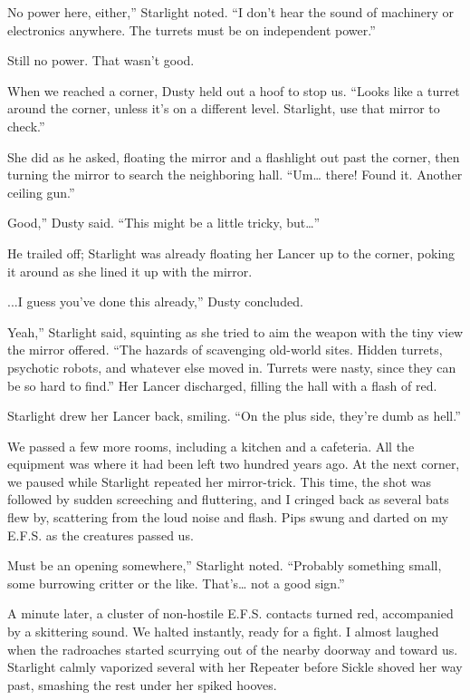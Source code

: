\leavevmode{}No power here, either,” Starlight noted. “I don’t hear the sound of machinery or electronics anywhere. The turrets must be on independent power.”

Still no power. That wasn’t good.

When we reached a corner, Dusty held out a hoof to stop us. “Looks like a turret around the corner, unless it’s on a different level. Starlight, use that mirror to check.”

She did as he asked, floating the mirror and a flashlight out past the corner, then turning the mirror to search the neighboring hall. “Um… there! Found it. Another ceiling gun.”

\leavevmode{}Good,” Dusty said. “This might be a little tricky, but…”

He trailed off; Starlight was already floating her Lancer up to the corner, poking it around as she lined it up with the mirror.

\leavevmode{}...I guess you’ve done this already,” Dusty concluded.

\leavevmode{}Yeah,” Starlight said, squinting as she tried to aim the weapon with the tiny view the mirror offered. “The hazards of scavenging old-world sites. Hidden turrets, psychotic robots, and whatever else moved in. Turrets were nasty, since they can be so hard to find.” Her Lancer discharged, filling the hall with a flash of red.

Starlight drew her Lancer back, smiling. “On the plus side, they’re dumb as hell.”

We passed a few more rooms, including a kitchen and a cafeteria. All the equipment was where it had been left two hundred years ago. At the next corner, we paused while Starlight repeated her mirror-trick. This time, the shot was followed by sudden screeching and fluttering, and I cringed back as several bats flew by, scattering from the loud noise and flash. Pips swung and darted on my E.F.S. as the creatures passed us.

\leavevmode{}Must be an opening somewhere,” Starlight noted. “Probably something small, some burrowing critter or the like. That’s… not a good sign.”

A minute later, a cluster of non-hostile E.F.S. contacts turned red, accompanied by a skittering sound. We halted instantly, ready for a fight. I almost laughed when the radroaches started scurrying out of the nearby doorway and toward us. Starlight calmly vaporized several with her Repeater before Sickle shoved her way past, smashing the rest under her spiked hooves.

